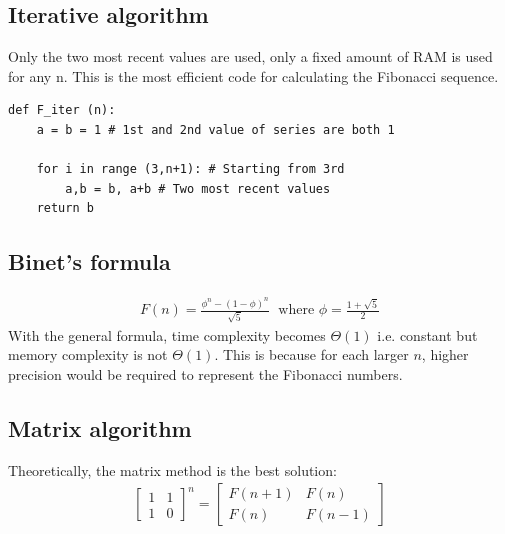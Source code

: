 \documentclass[10pt,a4paper]{article}
\begin{document}
\subsection{Iterative algorithm}

Only the two most recent values are used, only a ﬁxed amount of RAM is used
for any n. This is the most eﬃcient code for calculating the Fibonacci sequence.

\begin{lstlisting}
def F_iter (n):
    a = b = 1 # 1st and 2nd value of series are both 1

    for i in range (3,n+1): # Starting from 3rd
        a,b = b, a+b # Two most recent values
    return b
\end{lstlisting}

\subsection{Binet’s formula}

\begin{align*}
    F(n) = \frac{\phi^n-(1-\phi)^n}{\sqrt{5}} \; \text{ where } \phi = \frac{1+\sqrt{5}}{2}
\end{align*}
With the general formula, time complexity becomes $\Theta(1)$ i.e. constant but
memory complexity is not $\Theta(1)$. This is because for each larger $n$, higher
precision would be required to represent the Fibonacci numbers.

\subsection{Matrix algorithm}

Theoretically, the matrix method is the best solution:
\begin{align*}
    \begin{bmatrix}
        1&1\\1&0
    \end{bmatrix}^n = 
    \begin{bmatrix}
        F(n+1)&F(n)\\F(n)&F(n-1)
    \end{bmatrix} 
\end{align*}
\end{document}
